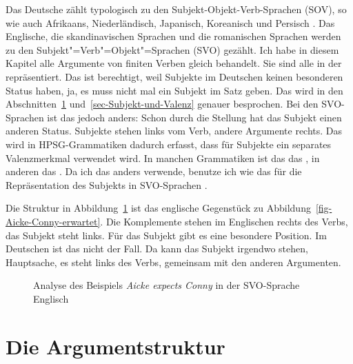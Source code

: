Das Deutsche zählt typologisch zu den Subjekt-Objekt-Verb-Sprachen (SOV), so wie \zb auch Afrikaans,
Niederländisch, Japanisch, Koreanisch und Persisch \citep{Haider2020a}. Das Englische, die skandinavischen Sprachen und die
romanischen Sprachen werden zu den Subjekt"=Verb"=Objekt"=Sprachen (SVO) gezählt. Ich habe in diesem Kapitel
alle Argumente von finiten Verben gleich behandelt. Sie sind alle in der \compsl repräsentiert. Das
ist berechtigt, weil Subjekte im Deutschen keinen besonderen Status haben, ja, es muss nicht mal
ein Subjekt im Satz geben. Das wird in den Abschnitten~\ref{sec-argst-Liste}
und~\ref{sec-Subjekt-und-Valenz} genauer besprochen. Bei den SVO-Sprachen
ist das jedoch anders: Schon durch die Stellung hat das Subjekt einen anderen Status. Subjekte
stehen links vom Verb, andere Argumente rechts. Das wird in HPSG-Grammatiken dadurch erfasst, dass
für Subjekte ein separates Valenzmerkmal verwendet wird. In manchen Grammatiken ist das das \subjm,
in anderen das \sprm. Da ich das \subjm anders verwende, benutze ich wie \citet*[Abschnitt~4.3]{SWB2003a} das \sprm
für die Repräsentation des Subjekts in SVO-Sprachen \citep[Abschnitt~4.3]{MuellerGermanic}.

Die Struktur in Abbildung~\ref{fig-Aicke-expects-Conny} ist das englische Gegenstück zu
Abbildung~\ref{fig-Aicke-Conny-erwartet}. Die Komplemente stehen im Englischen rechts des Verbs, das
Subjekt steht links. Für das Subjekt gibt es eine besondere Position. Im Deutschen ist das nicht der
Fall. Da kann das Subjekt irgendwo stehen, Hauptsache, es steht links des Verbs, gemeinsam mit den
anderen Argumenten.
\begin{figure}
\caption{\label{fig-Aicke-expects-Conny}Analyse des Beispiels \emph{Aicke expects Conny} in der
  SVO-Sprache Englisch}
\end{figure}



\section{Die Argumentstruktur}
\label{sec-argst-Liste}

